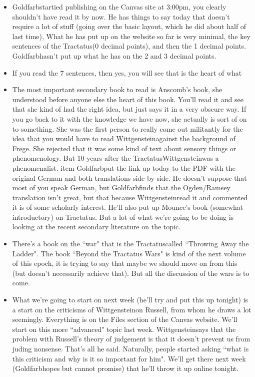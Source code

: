 \documentclass[12pt]{article}
\theoremstyle{definition}
\newcommand{\w}{Wittgenstein}
\newcommand{\T}{Tractatus}
\newcommand{\g}{Goldfarb}
\begin{document}
\begin{itemize}
    \itemsep0em 
    \item \g startied publishing on the Canvas site at 3:00pm, you clearly shouldn't have read it by now. He has things to say today that doesn't require a lot of stuff (going over the basic layout, which he did about half of last time), What he has put up on the website so far is very minimal, the key sentences of the \T (0 decimal points), and then the 1 decimal points. \g hasn't put up what he has on the 2 and 3 decimal points.
    \item If you read the 7 sentences, then yes, you will see that is the heart of what 
    \item The most important secondary book to read is Anscomb's book, she understood before anyone else the heart of this book. You'll read it and see that she kind of had the right idea, but just says it in a very obscure way. If you go back to it with the knowledge we have now, she actually is sort of on to something. She was the first person to really come out militantly for the idea that you would have to read \w against the background of Frege. She rejected that it was some kind of text about sensory things or phenomenology. But 10 years after the \T \w was a phenomenalist.
    item \g put the link up today to the PDF with the original German and both translations side-by-side. He doesn't suppose that most of you speak German, but \g finds that the Ogden/Ramsey translation isn't great, but that because \w read it and commented it is of some scholarly interest. He'll also put up Mounce's book (somewhat introductory) on \T. But a lot of what we're going to be doing is looking at the recent secondary literature on the topic.
    \item There's a book on the ``war" that is the \T called ``Throwing Away the Ladder". The book ``Beyond the Tractatus Wars" is kind of the next volume of this epoch, it is trying to say that maybe we should move on from this (but doesn't necessarily achieve that). But all the discussion of the wars is to come.
    \item What we're going to start on next week (he'll try and put this up tonight) is a start on the criticisms of \w  on Russell, from whom he draws a lot seemingly. Everything is on the Files section of the Canvas website. We'll start on this more ``advanced" topic last week. \w says that the problem with Russell's theory of judgement is that it doesn't prevent us from juding nonsense. That's all he said. Naturally, people started asking ``what is this criticism and why is it so important for him". We'll get there next week (\g hopes but cannot promise) that he'll throw it up online tonight.

\end{itemize}
\end{document}
